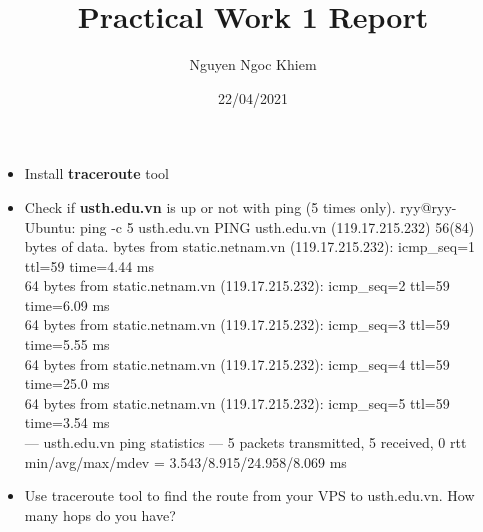 \documentclass{article}
\title{Practical Work 1 Report}
\author {Nguyen Ngoc Khiem}
\date{22/04/2021}
\begin{document}
\maketitle

\begin{itemize}
    \item Install \textbf{traceroute} tool
    \item Check if \textbf{usth.edu.vn} is up or not with ping (5 times only).
\newline ryy@ryy-Ubuntu: ping -c 5 usth.edu.vn
\newline PING usth.edu.vn (119.17.215.232) 56(84) bytes of data.
 bytes from static.netnam.vn (119.17.215.232): icmp_seq=1 ttl=59 time=4.44 ms \\
64 bytes from static.netnam.vn (119.17.215.232): icmp_seq=2 ttl=59 time=6.09 ms \\
64 bytes from static.netnam.vn (119.17.215.232): icmp_seq=3 ttl=59 time=5.55 ms \\
64 bytes from static.netnam.vn (119.17.215.232): icmp_seq=4 ttl=59 time=25.0 ms \\
64 bytes from static.netnam.vn (119.17.215.232): icmp_seq=5 ttl=59 time=3.54 ms \\

--- usth.edu.vn ping statistics ---
5 packets transmitted, 5 received, 0%
rtt min/avg/max/mdev = 3.543/8.915/24.958/8.069 ms
     \item Use traceroute tool to find the route from your VPS to usth.edu.vn. How many hops do you have?


\end{itemize}
\end{document}

